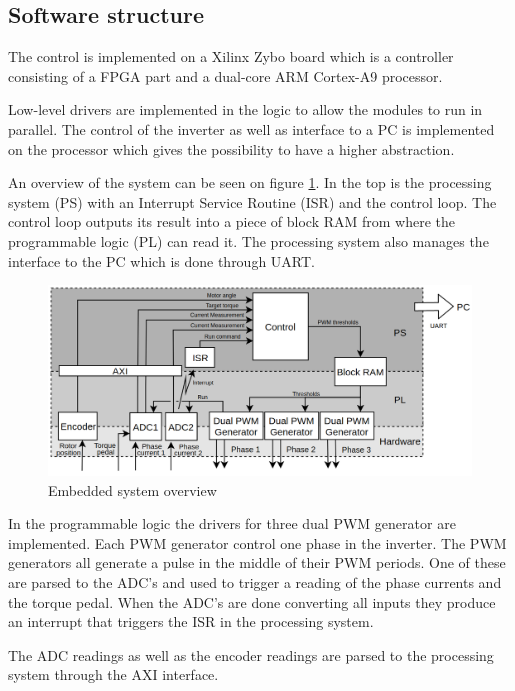 \subsection{Software structure}
The control is implemented on a Xilinx Zybo board which is a controller consisting of a FPGA part and a dual-core ARM Cortex-A9 processor.

    Low-level drivers are implemented in the logic to allow the modules to run in parallel. The control of the inverter as well as interface to a PC is implemented on the processor which gives the possibility to have a higher abstraction. 

An overview of the system can be seen on figure \ref{fig:embedded_overview}. In the top is the processing system (PS) with an Interrupt Service Routine (ISR) and the control loop. The control loop outputs its result into a piece of block RAM from where the programmable logic (PL) can read it. The processing system also manages the interface to the PC which is done through UART.

\begin{figure}[H]
	\centering
	\includegraphics[width=1\linewidth]{pictures/software/embedded_overview.png}
	\caption{Embedded system overview}
	\label{fig:embedded_overview}
\end{figure}


In the programmable logic the drivers for three dual PWM generator are implemented. Each PWM generator control one phase in the inverter. The PWM generators all generate a pulse in the middle of their PWM periods. One of these are parsed to the ADC's and used to trigger a reading of the phase currents and the torque pedal. When the ADC's are done converting all inputs they produce an interrupt that triggers the ISR in the processing system.

The ADC readings as well as the encoder readings are parsed to the processing system through the AXI interface.



